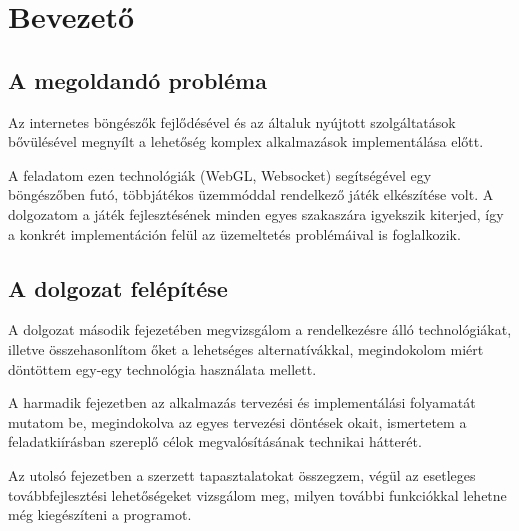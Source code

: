 \chapter{Bevezető}

\section{A megoldandó probléma}

Az internetes böngészők fejlődésével és az általuk nyújtott szolgáltatások
bővülésével megnyílt a lehetőség komplex alkalmazások implementálása előtt.

A feladatom ezen technológiák (WebGL, Websocket) segítségével egy böngészőben
futó, többjátékos üzemmóddal rendelkező játék elkészítése volt. A dolgozatom a
játék fejlesztésének minden egyes szakaszára igyekszik kiterjed, így a konkrét
implementáción felül az üzemeltetés problémáival is foglalkozik.

\section{A dolgozat felépítése}

A dolgozat második fejezetében megvizsgálom a rendelkezésre álló
technológiákat, illetve összehasonlítom őket a lehetséges alternatívákkal,
megindokolom miért döntöttem egy-egy technológia használata mellett.

A harmadik fejezetben az alkalmazás tervezési és implementálási folyamatát
mutatom be, megindokolva az egyes tervezési döntések okait, ismertetem a
feladatkiírásban szereplő célok megvalósításának technikai hátterét.

Az utolsó fejezetben a szerzett tapasztalatokat összegzem, végül az esetleges
továbbfejlesztési lehetőségeket vizsgálom meg, milyen további funkciókkal
lehetne még kiegészíteni a programot.
